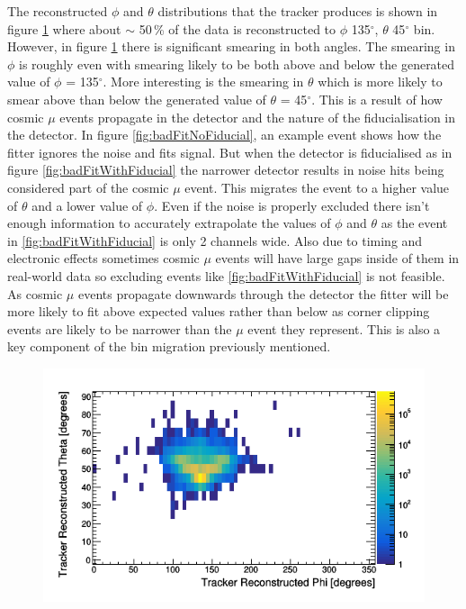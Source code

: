 The reconstructed $\phi$ and $\theta$ distributions that the tracker produces is shown in figure \ref{fig:pVsTWithDeadLog} where about $\sim$ 50\,\% of the data is reconstructed to $\phi$ 135$^\circ$, $\theta$ 45$^\circ$ bin. However, in figure \ref{fig:pVsTWithDeadLog} there is significant smearing in both angles. The smearing in $\phi$ is roughly even with smearing likely to be both above and below the generated value of $\phi$ = 135$^\circ$. More interesting is the smearing in $\theta$ which is more likely to smear above than below the generated value of $\theta$ = 45$^\circ$. This is a result of how cosmic $\mu$ events propagate in the detector and the nature of the fiducialisation in the detector. In figure \ref{fig:badFitNoFiducial}, an example event shows how the fitter ignores the noise and fits signal. But when the detector is fiducialised as in figure \ref{fig:badFitWithFiducial} the narrower detector results in noise hits being considered part of the cosmic $\mu$ event. This migrates the event to a higher value of $\theta$ and a lower value of $\phi$. Even if the noise is properly excluded there isn't enough information to accurately extrapolate the values of $\phi$ and $\theta$ as the event in \ref{fig:badFitWithFiducial} is only 2 channels wide. Also due to timing and electronic effects sometimes cosmic $\mu$ events will have large gaps inside of them in real-world data so excluding events like \ref{fig:badFitWithFiducial} is not feasible. As cosmic $\mu$ events propagate downwards through the detector the fitter will be more likely to fit above expected values rather than below as corner clipping events are likely to be narrower than the $\mu$ event they represent. This is also a key component of the bin migration previously mentioned. 

\begin{figure}[!h]
 \centering
 \includegraphics[width=0.7\linewidth]{Chapter5/Figs/cosmicTrackerUncertainties/pVsTWithDeadLog.png}
 \label{fig:pVsTWithDeadLog}
\end{figure}

